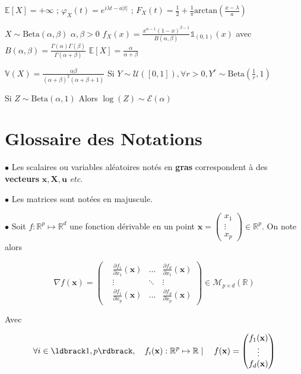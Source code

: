 \documentclass[12pt]{article}
\newcommand{\petitespace}{\vspace{0.5cm}}
\newcommand{\bb}[1]{\mathbb{#1}} %
\newcommand{\R}{\bb{R}} %
\renewcommand{\bf}[1]{\mathbf{#1}}
\renewcommand{\d}{\partial} %
\renewcommand{\cal}{\mathcal}
\renewcommand{\bf}[1]{\mathbf{#1}}
\newcommand{\Expo}[1]{\mathcal E(#1)}%
\newcommand{\esp}[1]{\bb{ E} \mathopen{}\left[#1\right]} %
\newcommand{\Var}[1]{\bb{ V} \mathopen{}\left(#1\right)} %
\newcommand{\1}{\bb{1}} %
\begin{document}
 $\esp{X} = +\infty$ ; $\varphi_X(t) = e^{i\lambda t-a\lvert t\rvert}$ ; $F_X(t) = \frac 12 + \frac 1\pi \text{arctan}(\frac{x-\lambda}{a}) $ \vspace{2em}

$\boxed{X\sim \text{Beta}(\alpha, \beta)}$  $\alpha, \beta>0$ $f_X(x) = \frac{x^{\alpha-1}(1-x)^{\beta-1}}{B(\alpha, \beta)}\1_{(0,1)}(x)$ avec $B(\alpha, \beta)=\frac{\Gamma(\alpha)\Gamma(\beta)}{\Gamma(\alpha+\beta)}$ $\esp{X}=\frac{\alpha}{\alpha+\beta}$\petitespace

 $\Var{X}=\frac{\alpha\beta}{(\alpha+\beta)^2(\alpha+\beta+1)}$ Si $Y \sim \cal U([0,1]), \forall r >0, Y^r \sim \text{Beta}(\frac 1r, 1)$ \petitespace
 
 Si $Z \sim\text{Beta}(\alpha, 1)$ Alors $\log(Z)\sim \Expo{\alpha}$


\newpage

\section{Glossaire des Notations}

$\bullet$ Les scalaires ou variables aléatoires notés en \textbf{gras} correspondent à des \textbf{vecteurs} $\bf x, \bf X, \bf u$ \textit{etc}.

$\bullet$ Les matrices sont notées en majuscule.

$\bullet$ Soit $f : \R^p \mapsto \R^d$ une fonction dérivable en un point $\bf x =\begin{pmatrix} x_1 \\ \vdots \\ x_p  \end{pmatrix}   \in \R^p$. On note alors \petitespace

$$\nabla f(\bf x) = \begin{pmatrix} &\frac{\d f_1}{\d x_1}(\bf x) & \ldots & \frac{\d f_d}{\d x_1}(\bf x) \\ &\vdots &\ddots &\vdots \\ & \frac{\d f_1}{\d x_p}(\bf x) & \ldots & \frac{\d f_d}{\d x_p}(\bf x) \end{pmatrix} \in \cal M_{p \times d}(\R)$$

Avec 


$$\forall i \in \ldbrack 1, p \rdbrack,\quad f_i(\bf x) : \R^p \mapsto \R\mid \quad f(\bf x) = \begin{pmatrix} f_1(\bf x) \\ \vdots \\ f_d( \bf x)    \end{pmatrix} $$
\end{document}
